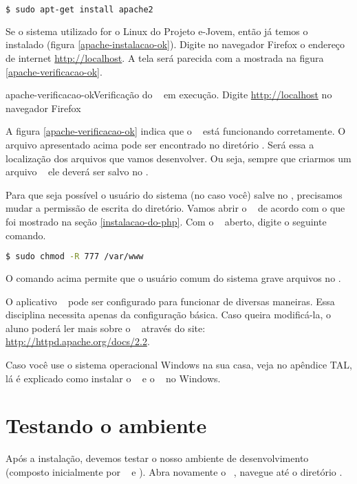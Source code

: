 \begin{lstlisting}[language=bash, style=Comandos]
  $ sudo apt-get install apache2
\end{lstlisting}

Se o sistema utilizado for o Linux do Projeto e-Jovem, então já temos o \apache
\apacheversao~ instalado (figura \ref{apache-instalacao-ok}). Digite no navegador 
Firefox o endereço de internet \url{http://localhost}. A tela será parecida com 
a mostrada na figura \ref{apache-verificacao-ok}.

			{apache-verificacao-ok}{Verificação do \apache~ em execução. Digite \url{http://localhost} no navegador Firefox}

A figura \ref{apache-verificacao-ok} indica que o \apache~ está funcionando corretamente.
O arquivo apresentado acima pode ser encontrado no diretório \dirpadrao. Será 
essa a localização dos arquivos que vamos desenvolver. Ou seja, sempre que criarmos
um arquivo \phpextensao~ ele deverá ser salvo no \dirpadrao. 

Para que seja possível o usuário do sistema (no caso você) salve no \dirpadrao,
precisamos mudar a permissão de escrita do diretório. Vamos abrir o \terminal~
de acordo com o que foi mostrado na seção \ref{instalacao-do-php}. Com o \terminal~
aberto, digite o seguinte comando.

\begin{lstlisting}[language=bash]
  $ sudo chmod -R 777 /var/www 
\end{lstlisting}

O comando acima permite que o usuário comum do sistema grave arquivos no \dirpadrao.

O aplicativo \apache~ pode ser configurado para funcionar de diversas maneiras. 
Essa disciplina necessita apenas da configuração básica. Caso queira modificá-la, 
o aluno poderá ler mais sobre o \apache~ através do site: \url{http://httpd.apache.org/docs/2.2}.

Caso você use o sistema operacional Windows na sua casa, veja no apêndice 
TAL, lá é explicado como instalar o \php~ e o \apache~ no Windows.


\section{Testando o ambiente}
\label{testando-ambiente}

Após a instalação, devemos testar o nosso ambiente de desenvolvimento (composto
inicialmente por \php~ e \apache). Abra novamente o \terminal~, navegue até o
diretório \dirpadrao.